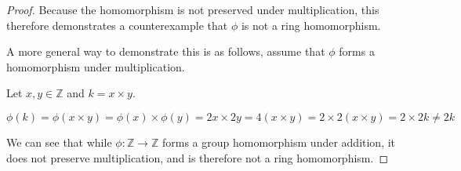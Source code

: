 \documentclass[a4paper]{article}
\begin{document}
\begin{myparindent}{0pt}
\begin{proof}
  Because the homomorphism is not preserved under multiplication, this therefore
  demonstrates a counterexample that $\phi$ is not a ring homomorphism.

  A more general way to demonstrate this is as follows, assume that $\phi$
  forms a homomorphism under multiplication. \newline

  Let $x, y \in \mathbb{Z}$ and $k = x \times y$.

  \[ \phi(k) = \phi(x \times y) = \phi(x) \times \phi(y) = 2x \times 2y = 4(x \times y) =
  2 \times 2(x \times y) = 2 \times 2k \neq 2k \]

  We can see that while $\phi: \mathbb{Z} \rightarrow \mathbb{Z}$ forms a group
  homomorphism under addition, it does not preserve multiplication, and is
  therefore not a ring homomorphism.

\end{proof}

\end{myparindent}
\end{document}
